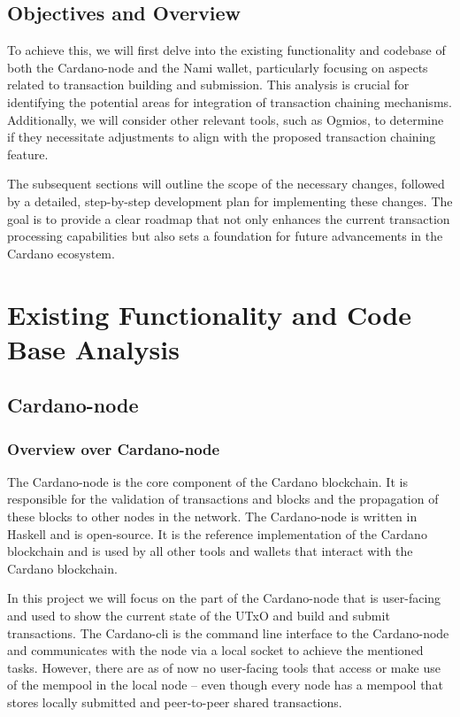 \documentclass[11pt]{article}
\begin{document}
\subsection{Objectives and Overview}
To achieve this, we will first delve into the existing functionality and codebase of both the Cardano-node and the Nami wallet,
particularly focusing on aspects related to transaction building and submission.
This analysis is crucial for identifying the potential areas for integration of transaction chaining mechanisms.
Additionally, we will consider other relevant tools, such as Ogmios, to determine if they necessitate adjustments to align with the proposed transaction chaining feature.

The subsequent sections will outline the scope of the necessary changes, followed by a detailed, step-by-step development plan for implementing these changes.
The goal is to provide a clear roadmap that not only enhances the current transaction processing capabilities but also sets a foundation for future advancements in the Cardano ecosystem.

\section{Existing Functionality and Code Base Analysis}
\subsection{Cardano-node}

\subsubsection{Overview over Cardano-node}

The Cardano-node is the core component of the Cardano blockchain.
It is responsible for the validation of transactions and blocks and the propagation of these blocks to other nodes in the network.
The Cardano-node is written in Haskell and is open-source.
It is the reference implementation of the Cardano blockchain and is used by all other tools and wallets that interact with the Cardano blockchain.

In this project we will focus on the part of the Cardano-node that is user-facing and used to show the current state of the UTxO and build and submit transactions.
The Cardano-cli is the command line interface to the Cardano-node and communicates with the node via a local socket to achieve the mentioned tasks.
However, there are as of now no user-facing tools that access or make use of the mempool in the local node -- even though every node has a mempool that stores locally submitted and
peer-to-peer shared transactions.
\end{document}
